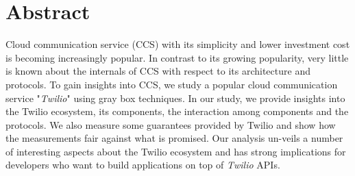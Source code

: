 \section{Abstract}
\label{sec-abstract}
Cloud communication service (CCS) with its simplicity and lower investment cost is becoming increasingly popular. In contrast to its growing popularity, very little is known about the internals of CCS with respect to its architecture and protocols. To gain insights into CCS, we study 
a popular cloud communication service "\textit{Twilio}" using gray box techniques. 
In our study, we  provide insights into the Twilio ecosystem, its components, the interaction among components and the protocols.
We also measure some guarantees 
provided by Twilio and show how the measurements fair against what is promised. Our analysis un-veils a number of interesting aspects about the Twilio ecosystem and has strong implications for developers who want to build applications on top of \textit{Twilio} APIs.
